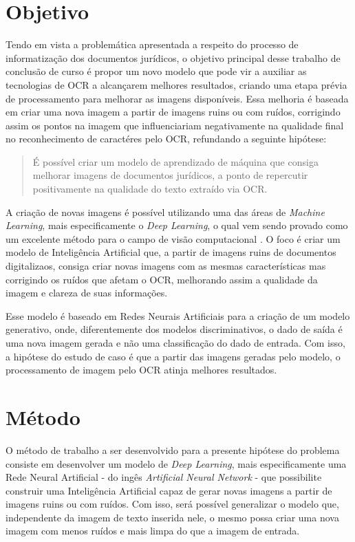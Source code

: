 \newpage

\section{Objetivo}

Tendo em vista a problemática apresentada a respeito do processo de informatização dos documentos jurídicos, o objetivo principal desse trabalho de conclusão de curso é propor um novo modelo que pode vir a auxiliar as tecnologias de OCR a alcançarem melhores resultados, criando uma etapa prévia de processamento para melhorar as imagens disponíveis. Essa melhoria é baseada em criar uma nova imagem a partir de imagens ruins ou com ruídos, corrigindo assim os pontos na imagem que influenciariam negativamente na qualidade final no reconhecimento de caractéres pelo OCR, refundando a seguinte hipótese:

\begin{quote}
  É possível criar um modelo de aprendizado de máquina que consiga melhorar imagens de documentos jurídicos, a ponto de repercutir positivamente na qualidade do texto extraído via OCR.
\end{quote}

A criação de novas imagens é possível utilizando uma das áreas de \textit{Machine Learning}, mais especificamente o \textit{Deep Learning}, o qual vem sendo provado como um excelente método para o campo de visão computacional \cite{dl-brief-review}. O foco é criar um modelo de Inteligência Artificial que, a partir de imagens ruins de documentos digitalizaos, consiga criar novas imagens com as mesmas características mas corrigindo os ruídos que afetam o OCR, melhorando assim a qualidade da imagem e clareza de suas informações.

Esse modelo é baseado em Redes Neurais Artificiais para a criação de um modelo generativo, onde, diferentemente dos modelos discriminativos, o dado de saída é uma nova imagem gerada e não uma classificação do dado de entrada. Com isso, a hipótese do estudo de caso é que a partir das imagens geradas pelo modelo, o processamento de imagem pelo OCR atinja melhores resultados.

\section{Método}

O método de trabalho a ser desenvolvido para a presente hipótese do problema consiste em desenvolver um modelo de \textit{Deep Learning}, mais especificamente uma Rede Neural Artificial - do ingês \textit{Artificial Neural Network} - que possibilite construir uma Inteligência Artificial capaz de gerar novas imagens a partir de imagens ruins ou com ruídos. Com isso, será possível generalizar o modelo que, independente da imagem de texto inserida nele, o mesmo possa criar uma nova imagem com menos ruídos e mais limpa do que a imagem de entrada.

